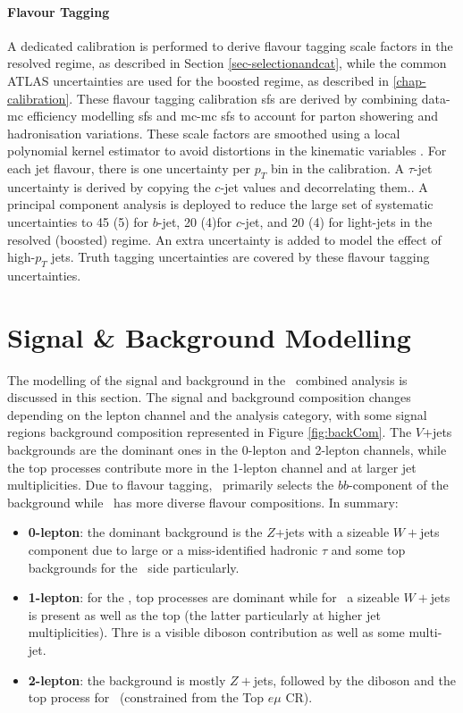 \paragraph{Flavour Tagging} A dedicated calibration is performed to derive flavour tagging scale factors in the resolved regime, as described in Section \ref{sec-selectionandcat}, while the common ATLAS uncertainties are used for the boosted regime, as described in \ref{chap-calibration}. These flavour tagging calibration \gls{sf}s are derived by combining data-\gls{mc} efficiency modelling \gls{sf}s and \gls{mc}-\gls{mc} \gls{sf}s to account for parton showering and hadronisation variations. These scale factors are smoothed using a local polynomial kernel estimator to avoid distortions in the kinematic variables \cite{ATL-PHYS-PUB-2020-004}. For each jet flavour, there is one uncertainty per $p_T$ bin in the calibration. A $\tau$-jet uncertainty is derived by copying the $c$-jet values and decorrelating them.. A principal component analysis is deployed to reduce the large set of systematic uncertainties to 45 (5) for $b$-jet, 20 (4)for $c$-jet, and 20 (4) for light-jets in the resolved (boosted) regime. An extra uncertainty is added to model the effect of high-$p_T$ jets. Truth tagging uncertainties are covered by these flavour tagging uncertainties.

%
\section{Signal \& Background Modelling}\label{sec-mod}
The modelling of the signal and background in the \vhbc\ combined analysis is discussed in this section. The signal and background composition changes depending on the lepton channel and the analysis category, with some signal regions background composition represented in Figure \ref{fig:backCom}. The $V$+jets backgrounds are the dominant ones in the 0-lepton and 2-lepton channels, while the top processes contribute more in the 1-lepton channel and at larger jet multiplicities. Due to flavour tagging, \vhb\ primarily selects the $bb$-component of the background while \vhc\ has more diverse flavour compositions. In summary:
\begin{itemize}
    \item \textbf{0-lepton}: the dominant background is the $Z$+jets with a sizeable $W+$jets component due to large \etm or a miss-identified hadronic $\tau$ and some top backgrounds for the \vhb\ side particularly.
    \item \textbf{1-lepton}: for the \vhb, top processes are dominant while for \vhc\ a sizeable $W+$jets is present as well as the top (the latter particularly at higher jet multiplicities). Thre is a visible diboson contribution as well as some multi-jet.  
    \item \textbf{2-lepton}: the background is mostly $Z+$jets, followed by the diboson and the top process for \vhb\ (constrained from the Top $e\mu$ CR). 
\end{itemize}

